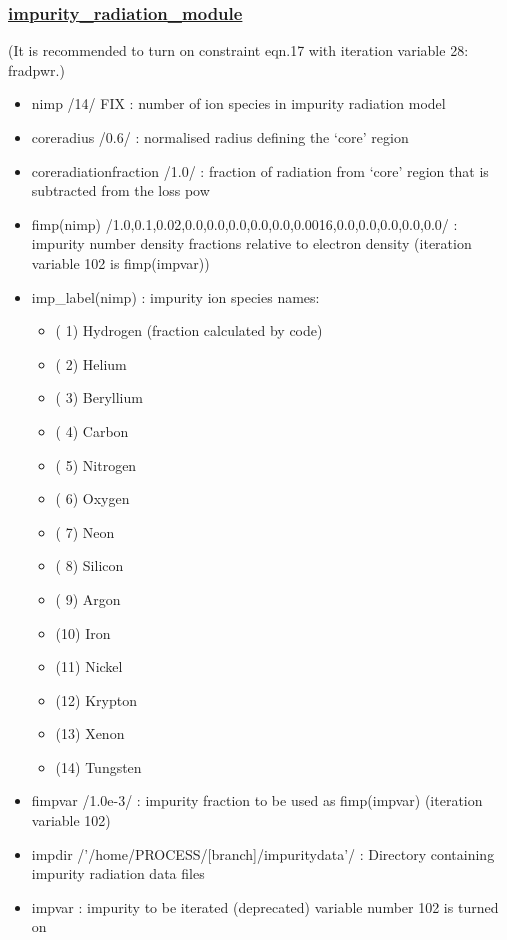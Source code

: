 \documentclass[]{article}
\providecommand{\tightlist}{%
  \setlength{\itemsep}{0pt}\setlength{\parskip}{0pt}}
\begin{document}
\subsubsection{\texorpdfstring{\href{impurity_radiation_module.html}{impurity\_radiation\_module}}{impurity\_radiation\_module}}\label{impurity_radiation_module}

(It is recommended to turn on constraint eqn.17 with iteration variable
28: fradpwr.)

\begin{itemize}
\tightlist
\item
  nimp /14/ FIX : number of ion species in impurity radiation model
\item
  coreradius /0.6/ : normalised radius defining the `core' region
\item
  coreradiationfraction /1.0/ : fraction of radiation from `core' region
  that is subtracted from the loss pow
\item
  fimp(nimp)
  /1.0,0.1,0.02,0.0,0.0,0.0,0.0,0.0,0.0016,0.0,0.0,0.0,0.0,0.0/ :
  impurity number density fractions relative to electron density
  (iteration variable 102 is fimp(impvar))
\item
  imp\_label(nimp) : impurity ion species names:

  \begin{itemize}
  \tightlist
  \item
    ( 1) Hydrogen (fraction calculated by code)
  \item
    ( 2) Helium
  \item
    ( 3) Beryllium
  \item
    ( 4) Carbon
  \item
    ( 5) Nitrogen
  \item
    ( 6) Oxygen
  \item
    ( 7) Neon
  \item
    ( 8) Silicon
  \item
    ( 9) Argon
  \item
    (10) Iron
  \item
    (11) Nickel
  \item
    (12) Krypton
  \item
    (13) Xenon
  \item
    (14) Tungsten
  \end{itemize}
\item
  fimpvar /1.0e-3/ : impurity fraction to be used as fimp(impvar)
  (iteration variable 102)
\item
  impdir /'/home/PROCESS/{[}branch{]}/impuritydata'/ : Directory
  containing impurity radiation data files
\item
  impvar : impurity to be iterated (deprecated) variable number 102 is
  turned on
\end{itemize}
\end{document}
